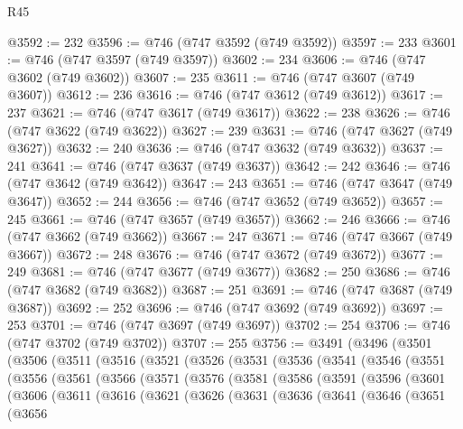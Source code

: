 \begin{lexlean}{R45}
\begin{coremodule}
@3592 := 232
@3596 := @746 (@747 @3592 (@749 @3592))
@3597 := 233
@3601 := @746 (@747 @3597 (@749 @3597))
@3602 := 234
@3606 := @746 (@747 @3602 (@749 @3602))
@3607 := 235
@3611 := @746 (@747 @3607 (@749 @3607))
@3612 := 236
@3616 := @746 (@747 @3612 (@749 @3612))
@3617 := 237
@3621 := @746 (@747 @3617 (@749 @3617))
@3622 := 238
@3626 := @746 (@747 @3622 (@749 @3622))
@3627 := 239
@3631 := @746 (@747 @3627 (@749 @3627))
@3632 := 240
@3636 := @746 (@747 @3632 (@749 @3632))
@3637 := 241
@3641 := @746 (@747 @3637 (@749 @3637))
@3642 := 242
@3646 := @746 (@747 @3642 (@749 @3642))
@3647 := 243
@3651 := @746 (@747 @3647 (@749 @3647))
@3652 := 244
@3656 := @746 (@747 @3652 (@749 @3652))
@3657 := 245
@3661 := @746 (@747 @3657 (@749 @3657))
@3662 := 246
@3666 := @746 (@747 @3662 (@749 @3662))
@3667 := 247
@3671 := @746 (@747 @3667 (@749 @3667))
@3672 := 248
@3676 := @746 (@747 @3672 (@749 @3672))
@3677 := 249
@3681 := @746 (@747 @3677 (@749 @3677))
@3682 := 250
@3686 := @746 (@747 @3682 (@749 @3682))
@3687 := 251
@3691 := @746 (@747 @3687 (@749 @3687))
@3692 := 252
@3696 := @746 (@747 @3692 (@749 @3692))
@3697 := 253
@3701 := @746 (@747 @3697 (@749 @3697))
@3702 := 254
@3706 := @746 (@747 @3702 (@749 @3702))
@3707 := 255
@3756 := @3491
    (@3496
      (@3501
        (@3506
          (@3511
            (@3516
              (@3521
                (@3526
                  (@3531
                    (@3536
                      (@3541
                        (@3546
                          (@3551
                            (@3556
                              (@3561
                                (@3566
                                  (@3571
                                    (@3576
                                      (@3581
                                        (@3586
                                          (@3591
                                            (@3596
                                              (@3601
                                                (@3606
                                                  (@3611
                                                    (@3616
                                                      (@3621
                                                        (@3626
                                                          (@3631
                                                            (@3636
                                                              (@3641
                                                                (@3646
                                                                  (@3651
                                                                    (@3656

\end{coremodule}
\end{lexlean}
